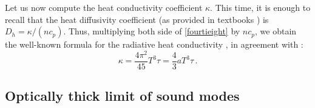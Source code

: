 \documentclass[a4paper, amsfonts, amssymb, amsmath, reprint, showkeys, nofootinbib, twoside,notitlepage,onecolumn]{revtex4-2}
\theoremstyle{definition}
\theoremstyle{theorem}
\theoremstyle{corollary}
\begin{document}
Let us now compute the heat conductivity coefficient $\kappa$. This time, it is enough to recall that the heat diffusivity coefficient (as provided in textbooks \cite[\S 50]{landau6}) is $D_h =\kappa/(nc_p)$. Thus, multiplying both side of \eqref{fourtieight} by $nc_p$, we obtain the well-known formula for the radiative heat conductivity \cite{NovikovThorne1973}, in agreement with \cite{Weinberg1971}:
\begin{equation}\label{kappuzzo}
\kappa = \dfrac{4\pi^2}{45} T^3 \tau = \dfrac{4}{3} a T^3 \tau  \, .
\end{equation}

\subsection{Optically thick limit of sound modes}
\end{document}
